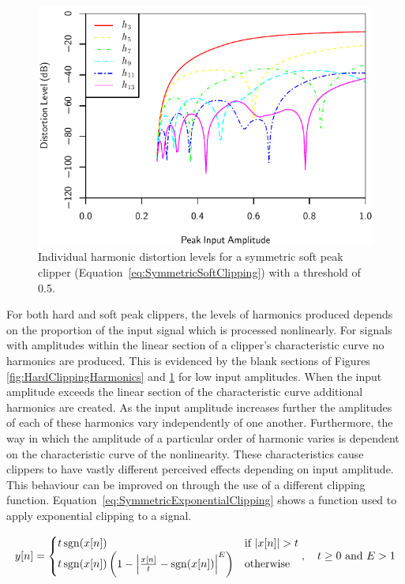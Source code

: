 			\begin{figure}[h!]
				\centering
				\includegraphics{chapter5/Images/SoftClippingHarmonics.pdf}
				\caption{Individual harmonic distortion levels for a symmetric soft peak clipper
					 (Equation~\ref{eq:SymmetricSoftClipping}) with a threshold of 0.5.}
				\label{fig:SoftClippingHarmonics}
			\end{figure}

			For both hard and soft peak clippers, the levels of harmonics produced depends on the proportion of
			the input signal which is processed nonlinearly. For signals with amplitudes within the linear
			section of a clipper's characteristic curve no harmonics are produced. This is evidenced by the
			blank sections of Figures \ref{fig:HardClippingHarmonics} and \ref{fig:SoftClippingHarmonics} for
			low input amplitudes. When the input amplitude exceeds the linear section of the characteristic
			curve additional harmonics are created. As the input amplitude increases further the amplitudes of
			each of these harmonics vary independently of one another. Furthermore, the way in which the
			amplitude of a particular order of harmonic varies is dependent on the characteristic curve of the
			nonlinearity. These characteristics cause clippers to have vastly different perceived effects
			depending on input amplitude. This behaviour can be improved on through the use of a different
			clipping function. Equation~\ref{eq:SymmetricExponentialClipping} shows a function used to apply
			exponential clipping to a signal.
			
			\begin{equation}
				y[n] = \begin{cases}
					t\operatorname{sgn}(x[n]) & \text{if $\left|x[n]\right| > t$} \\
					t\operatorname{sgn}(x[n]) \left(1 - \left|\frac{x[n]}{t} - \operatorname{sgn}(x[n])\right|^{E} \right) &
						\text{otherwise}
				\end{cases}, \quad t \geq 0 \ \text{and} \ E > 1
				\label{eq:SymmetricExponentialClipping}
			\end{equation}

